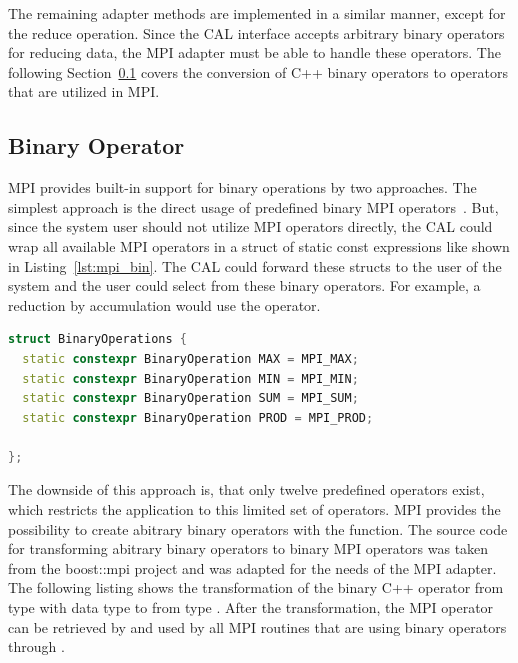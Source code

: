 \noindent The remaining adapter methods are implemented in a similar
manner, except for the reduce operation. Since the CAL interface
accepts arbitrary binary operators for reducing data, the MPI adapter
must be able to handle these
operators. The following Section~\ref{sec:bin_operator} covers the conversion of C++
binary operators to operators that are utilized in MPI.

\subsection{Binary Operator}
\label{sec:bin_operator}

MPI provides built-in support for binary operations by two
approaches. The simplest approach is the direct usage of predefined
binary MPI operators~\cite{ref:mpi_bin_op}. But, since the system user
should not utilize MPI operators directly, the CAL could wrap all
available MPI operators in a struct of static const expressions like
shown in Listing~\ref{lst:mpi_bin}.  The CAL could forward these
structs to the user of the system and the user could select from these
binary operators.  For example, a reduction by accumulation would use
the  operator.

\begin{minipage}[t]{\textwidth} 
\begin{lstlisting}[language=C++, caption={A subset of binary operators derived by transforming MPI operations to static const expressions. }, label=lst:mpi_bin]
struct BinaryOperations { 
  static constexpr BinaryOperation MAX = MPI_MAX; 
  static constexpr BinaryOperation MIN = MPI_MIN; 
  static constexpr BinaryOperation SUM = MPI_SUM; 
  static constexpr BinaryOperation PROD = MPI_PROD; 

};
\end{lstlisting}
\end{minipage}


\noindent The downside of this approach is, that only twelve predefined
operators exist, which restricts the application to this limited set of
operators. MPI provides the possibility to create abitrary
binary operators with the  function.  The source
code for transforming abitrary binary operators to binary MPI
operators was taken from the boost::mpi project
\cite{ref:boost_mpi} and was adapted for the needs of the MPI adapter.
The following listing shows the transformation of the binary C++
operator  from type  with data type
 to  from type .  After the
transformation, the MPI operator can be retrieved by and used by all
MPI routines that are using binary operators through
.

